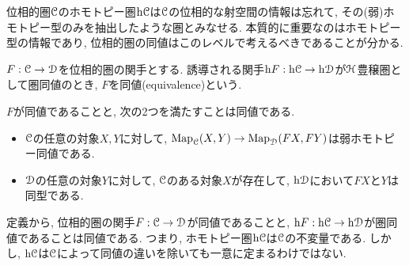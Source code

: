 \documentclass[uplatex, a4paper, 14Q, dvipdfmx]{jsreport}
\begin{document}
位相的圏$\mathcal{C}$のホモトピー圏$\mathrm{h}\mathcal{C}$は$\mathcal{C}$の位相的な射空間の情報は忘れて, その(弱)ホモトピー型のみを抽出したような圏とみなせる. 
本質的に重要なのはホモトピー型の情報であり, 位相的圏の同値はこのレベルで考えるべきであることが分かる. 

\begin{definition}[位相的圏の同値] \label{def.1.1.3.6}
  $F : \mathcal{C} \to \mathcal{D}$を位相的圏の関手とする. 
  誘導される関手$\mathrm{h} F : \mathrm{h}\mathcal{C} \to \mathrm{h}\mathcal{D}$が$\mathcal{H}$豊穣圏として圏同値のとき, $F$を同値(equivalence)という. 
\end{definition}

\begin{remark} \label{rem.1.1.3.7}
  $F$が同値であることと, 次の2つを満たすことは同値である.
  \begin{itemize}
    \item $\mathcal{C}$の任意の対象$X,Y$に対して, $\mathrm{Map}_{\mathcal{C}}(X,Y) \to \mathrm{Map}_{\mathcal{D}}(FX,FY)$は弱ホモトピー同値である. 
    \item $\mathcal{D}$の任意の対象$Y$に対して, $\mathcal{C}$のある対象$X$が存在して, $\mathrm{h}\mathcal{D}$において$FX$と$Y$は同型である. 
  \end{itemize}
\end{remark}

定義から, 位相的圏の関手$F : \mathcal{C} \to \mathcal{D}$が同値であることと, $\mathrm{h} F : \mathrm{h}\mathcal{C} \to \mathrm{h}\mathcal{D}$が圏同値であることは同値である. 
つまり, ホモトピー圏$\mathrm{h}\mathcal{C}$は$\mathcal{C}$の不変量である. 
しかし, $\mathrm{h}\mathcal{C}$は$\mathcal{C}$によって同値の違いを除いても一意に定まるわけではない. 
\end{document}
